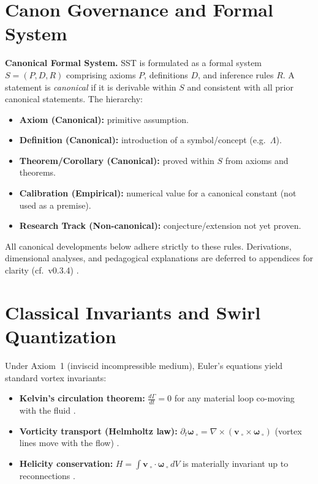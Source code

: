 \documentclass[11pt]{article}
\begin{document}
	\titlepageClose

	\section{Canon Governance and Formal System}

	\textbf{Canonical Formal System.} SST is formulated as a formal system $S = (P, D, R)$ comprising axioms $P$, definitions $D$, and inference rules $R$. A statement is \emph{canonical} if it is derivable within $S$ and consistent with all prior canonical statements. The hierarchy:
	\begin{itemize}
		\item \textbf{Axiom (Canonical):} primitive assumption.
		\item \textbf{Definition (Canonical):} introduction of a symbol/concept (e.g.\ $\Lambda$).
		\item \textbf{Theorem/Corollary (Canonical):} proved within $S$ from axioms and theorems.
		\item \textbf{Calibration (Empirical):} numerical value for a canonical constant (not used as a premise).
		\item \textbf{Research Track (Non-canonical):} conjecture/extension not yet proven.
	\end{itemize}
	All canonical developments below adhere strictly to these rules. Derivations, dimensional analyses, and pedagogical explanations are deferred to appendices for clarity (cf.\ v0.3.4) \cite{Iskandarani2025Canon034}.

	\section{Classical Invariants and Swirl Quantization}

	Under Axiom~1 (inviscid incompressible medium), Euler’s equations yield standard vortex invariants:
	\begin{itemize}
		\item \textbf{Kelvin’s circulation theorem:} $\frac{d\Gamma}{dt}=0$ for any material loop co-moving with the fluid \cite{Batchelor1967,Saffman1992}.
		\item \textbf{Vorticity transport (Helmholtz law):} $\partial_t \boldsymbol{\omega}_{\!\!\;\circ} = \nabla \times (\mathbf{v}_{\!\!\;\circ}\times \boldsymbol{\omega}_{\!\!\;\circ})$ (vortex lines move with the flow) \cite{Helmholtz1858,Kelvin1869}.
		\item \textbf{Helicity conservation:} $H=\int \mathbf{v}_{\!\!\;\circ}\cdot\boldsymbol{\omega}_{\!\!\;\circ}\,dV$ is materially invariant up to reconnections \cite{Moffatt1969}.
	\end{itemize}
\end{document}
